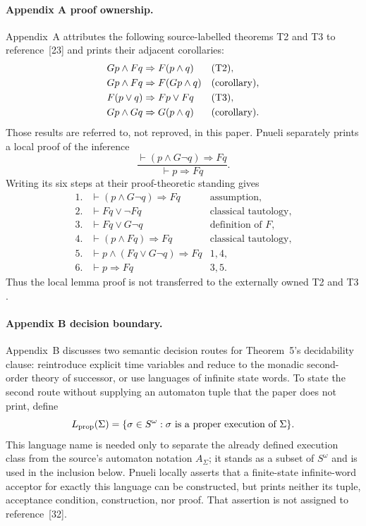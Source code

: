 \paragraph{Appendix A proof ownership.}
Appendix~A attributes the following source-labelled theorems T2 and T3 to
reference~[23] and prints their adjacent corollaries:
\[
\begin{aligned}
 Gp\land Fq&\Rightarrow F(p\land q) &&({\rm T2}),\\
 Gp\land Fq&\Rightarrow F(Gp\land q) &&({\rm corollary}),\\
 F(p\lor q)&\Rightarrow Fp\lor Fq &&({\rm T3}),\\
 Gp\land Gq&\Rightarrow G(p\land q) &&({\rm corollary}).
\end{aligned}
\]
Those results are referred to, not reproved, in this paper.  Pnueli separately
prints a local proof of the inference
\[
 \frac{\vdash(p\land G\neg q)\Rightarrow Fq}
      {\vdash p\Rightarrow Fq}.
\]
Writing its six steps at their proof-theoretic standing gives
\[
\begin{array}{rll}
1.&\vdash(p\land G\neg q)\Rightarrow Fq&\text{assumption},\\
2.&\vdash Fq\lor\neg Fq&\text{classical tautology},\\
3.&\vdash Fq\lor G\neg q&\text{definition of }F,\\
4.&\vdash(p\land Fq)\Rightarrow Fq&\text{classical tautology},\\
5.&\vdash p\land(Fq\lor G\neg q)\Rightarrow Fq&1,4,\\
6.&\vdash p\Rightarrow Fq&3,5.
\end{array}
\]
Thus the local lemma proof is not transferred to the externally owned T2 and
T3 \cite[p.~57]{Pnueli1977}.

\paragraph{Appendix B decision boundary.}
Appendix~B discusses two semantic decision routes for Theorem~5's decidability
clause: reintroduce explicit time variables and reduce to the monadic
second-order theory of successor, or use languages of infinite state words.
To state the second route without
supplying an automaton tuple that the paper does not print, define
\[
 L_{\rm prop}(\Sigma)
 =\{\sigma\in S^\omega:\sigma\text{ is a proper execution of }\Sigma\}.
\]
This language name is needed only to separate the already defined execution
class from the source's automaton notation \(A_\Sigma\); it stands as a
subset of \(S^\omega\) and is used in the inclusion below.  Pnueli locally
asserts that a finite-state infinite-word acceptor for exactly this language
can be constructed, but prints neither its tuple, acceptance condition,
construction, nor proof.  That assertion is not assigned to reference~[32].

